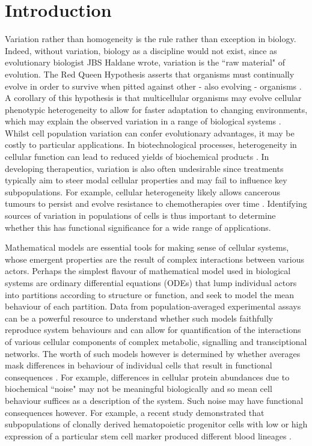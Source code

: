 \documentclass[10pt,letterpaper]{article}
\begin{document}
\section{Introduction}
Variation rather than homogeneity is the rule rather than exception in biology. Indeed, without variation, biology as a discipline would not exist, since as evolutionary biologist JBS Haldane wrote, variation is the ``raw material" of evolution. The Red Queen Hypothesis asserts that organisms must continually evolve in order to survive when pitted against other - also evolving - organisms \cite{ridley1994red}. A corollary of this hypothesis is that multicellular organisms may evolve cellular phenotypic heterogeneity to allow for faster adaptation to changing environments, which may explain the observed variation in a range of biological systems \cite{fraser2009chance}. Whilst cell population variation can confer evolutionary advantages, it may be costly to particular applications. In biotechnological processes, heterogeneity in cellular function can lead to reduced yields of biochemical products \cite{delvigne2014metabolic}. In developing therapeutics, variation is also often undesirable since treatments typically aim to steer modal cellular properties and may fail to influence key subpopulations. For example, cellular heterogeneity likely allows cancerous tumours to persist \cite{gatenby2007cellular} and evolve resistance to chemotherapies over time \cite{altrock2015mathematics}. Identifying sources of variation in populations of cells is thus important to determine whether this has functional significance for a wide range of applications.

Mathematical models are essential tools for making sense of cellular systems, whose emergent properties are the result of complex interactions between various actors. Perhaps the simplest flavour of mathematical model used in biological systems are ordinary differential equations (ODEs) that lump individual actors into partitions according to structure or function, and seek to model the mean behaviour of each partition. Data from population-averaged experimental assays can be a powerful resource to understand whether such models faithfully reproduce system behaviours and can allow for quantification of the interactions of various cellular components of complex metabolic, signalling and transciptional networks. The worth of such models however is determined by whether averages mask differences in behaviour of individual cells that result in functional consequences \cite{altschuler2010cellular}. For example, differences in cellular protein abundances due to biochemical ``noise" may not be meaningful biologically \cite{elowitz2002stochastic} and so mean cell behaviour suffices as a description of the system. Such noise may have functional consequences however. For example, a recent study demonstrated that subpopulations of clonally derived hematopoietic progenitor cells with low or high expression of a particular stem cell marker produced different blood lineages \cite{chang2008transcriptome}. 
\end{document}
